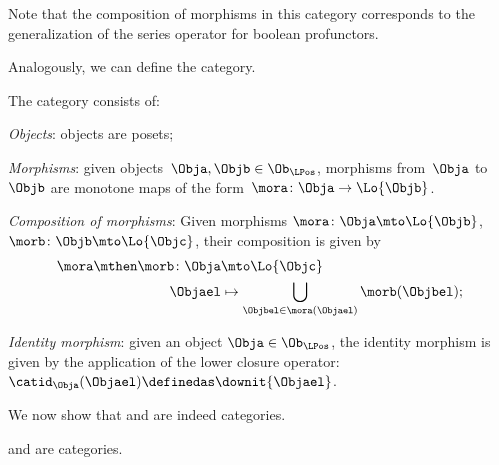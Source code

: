 
\begin{remark}
Note that the composition of morphisms in this category corresponds to the generalization of the series operator for boolean profunctors.
\end{remark}

Analogously, we can define the \LPos category.
\begin{definition}
\label{def:lpos_cat}
The category \LPos consists of:
\begin{compactenum}
    \item \emph{Objects}: objects are posets;
    \item \emph{Morphisms}: given objects~$\Obja,\Objb\in \Ob_\LPos$, morphisms from~$\Obja$ to~$\Objb$ are monotone maps of the form~$\mora \colon \Obja \to \Lo{\Objb}$.
    \item \emph{Composition of morphisms}: Given morphisms $\mora \colon \Obja \mto \Lo{\Objb}$, $\morb \colon \Objb\mto \Lo{\Objc}$, their composition is given by
    \begin{equation}
    \begin{aligned}
        \mora \mthen \morb \colon \Obja &\mto \Lo{\Objc}\\
        \Objael&\mapsto \bigcup_{\Objbel\in \mora (\Objael)}\morb(\Objbel);
    \end{aligned}
    \end{equation}
    \item \emph{Identity morphism}: given an object $\Obja\in \Ob_\LPos$, the identity morphism is given by the application of the lower closure operator:~$\catid_\Obja(\Objael)\definedas \downit\{\Objael\}$.
\end{compactenum}
\end{definition}
We now show that \UPos and \LPos are indeed categories.

\begin{lemma}
\label{lem:upos_lpos_cats}
\UPos and \LPos are categories.
\end{lemma}

